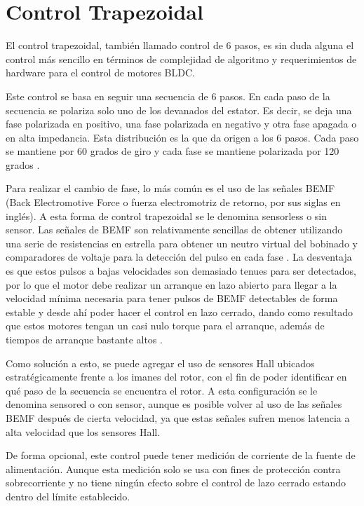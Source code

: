 \documentclass[11pt]{report}
\begin{document}
\section{Control Trapezoidal}
El control trapezoidal, también llamado control de 6 pasos, es sin duda alguna el control más sencillo en términos de complejidad de algoritmo y requerimientos de hardware para el control de motores BLDC.

Este control se basa en seguir una secuencia de 6 pasos. En cada paso de la secuencia se polariza solo uno de los devanados del estator. Es decir, se deja una fase polarizada en positivo, una fase polarizada en negativo y otra fase apagada o en alta impedancia. Esta distribución es la que da origen a los 6 pasos. Cada paso se mantiene por 60 grados de giro y cada fase se mantiene polarizada por 120 grados \cite{fisher2014high}.

Para realizar el cambio de fase, lo más común es el uso de las señales BEMF (Back Electromotive Force o fuerza electromotriz de retorno, por sus siglas en inglés). A esta forma de control trapezoidal se le denomina sensorless o sin sensor. Las señales de BEMF son relativamente sencillas de obtener utilizando una serie de resistencias en estrella para obtener un neutro virtual del bobinado y comparadores de voltaje para la detección del pulso en cada fase \cite{shao2003direct}. La desventaja es que estos pulsos a bajas velocidades son demasiado tenues para ser detectados, por lo que el motor debe realizar un arranque en lazo abierto para llegar a la velocidad mínima necesaria para tener pulsos de BEMF detectables de forma estable y desde ahí poder hacer el control en lazo cerrado, dando como resultado que estos motores tengan un casi nulo torque para el arranque, además de tiempos de arranque bastante altos \cite{Gualtieri2018}.

Como solución a esto, se puede agregar el uso de sensores Hall ubicados estratégicamente frente a los imanes del rotor, con el fin de poder identificar en qué paso de la secuencia se encuentra el rotor. A esta configuración se le denomina sensored o con sensor, aunque es posible volver al uso de las señales BEMF después de cierta velocidad, ya que estas señales sufren menos latencia a alta velocidad que los sensores Hall.

De forma opcional, este control puede tener medición de corriente de la fuente de alimentación. Aunque esta medición solo se usa con fines de protección contra sobrecorriente y no tiene ningún efecto sobre el control de lazo cerrado estando dentro del límite establecido.
\end{document}
